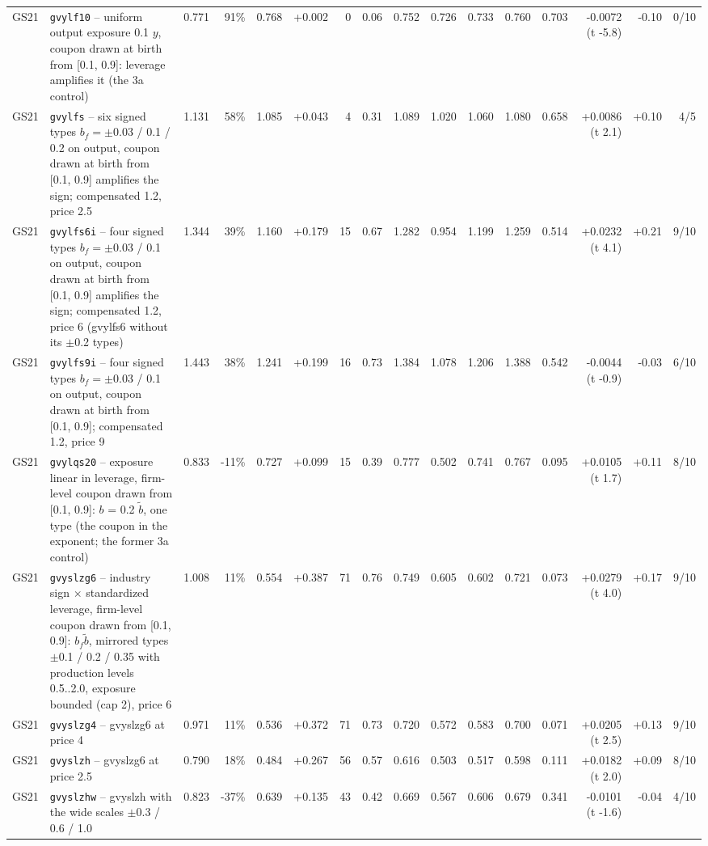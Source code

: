 \begin{landscape}
\begin{longtable}{lp{4.6cm}rrrrrrrrrrrrrr}
GS21 & \texttt{gvylf10} -- uniform output exposure 0.1 $y$, coupon drawn at birth from [0.1, 0.9]: leverage amplifies it (the 3a control) & 0.771 & 91\% & 0.768 & +0.002 & 0 & 0.06 & 0.752 & 0.726 & 0.733 & 0.760 & 0.703 & -0.0072 (t -5.8) & -0.10 & 0/10 \\
GS21 & \texttt{gvylfs} -- six signed types $b_f = \pm$0.03 / 0.1 / 0.2 on output, coupon drawn at birth from [0.1, 0.9] amplifies the sign; compensated 1.2, price 2.5 & 1.131 & 58\% & 1.085 & +0.043 & 4 & 0.31 & 1.089 & 1.020 & 1.060 & 1.080 & 0.658 & +0.0086 (t 2.1) & +0.10 & 4/5 \\
GS21 & \texttt{gvylfs6i} -- four signed types $b_f = \pm$0.03 / 0.1 on output, coupon drawn at birth from [0.1, 0.9] amplifies the sign; compensated 1.2, price 6 (gvylfs6 without its $\pm$0.2 types) & 1.344 & 39\% & 1.160 & +0.179 & 15 & 0.67 & 1.282 & 0.954 & 1.199 & 1.259 & 0.514 & +0.0232 (t 4.1) & +0.21 & 9/10 \\
GS21 & \texttt{gvylfs9i} -- four signed types $b_f = \pm$0.03 / 0.1 on output, coupon drawn at birth from [0.1, 0.9]; compensated 1.2, price 9 & 1.443 & 38\% & 1.241 & +0.199 & 16 & 0.73 & 1.384 & 1.078 & 1.206 & 1.388 & 0.542 & -0.0044 (t -0.9) & -0.03 & 6/10 \\
GS21 & \texttt{gvylqs20} -- exposure linear in leverage, firm-level coupon drawn from [0.1, 0.9]: $b$ = 0.2 $\tilde b$, one type (the coupon in the exponent; the former 3a control) & 0.833 & -11\% & 0.727 & +0.099 & 15 & 0.39 & 0.777 & 0.502 & 0.741 & 0.767 & 0.095 & +0.0105 (t 1.7) & +0.11 & 8/10 \\
GS21 & \texttt{gvyslzg6} -- industry sign $\times$ standardized leverage, firm-level coupon drawn from [0.1, 0.9]: $b_f \tilde b$, mirrored types $\pm$0.1 / 0.2 / 0.35 with production levels 0.5..2.0, exposure bounded (cap 2), price 6 & 1.008 & 11\% & 0.554 & +0.387 & 71 & 0.76 & 0.749 & 0.605 & 0.602 & 0.721 & 0.073 & +0.0279 (t 4.0) & +0.17 & 9/10 \\
GS21 & \texttt{gvyslzg4} -- gvyslzg6 at price 4 & 0.971 & 11\% & 0.536 & +0.372 & 71 & 0.73 & 0.720 & 0.572 & 0.583 & 0.700 & 0.071 & +0.0205 (t 2.5) & +0.13 & 9/10 \\
GS21 & \texttt{gvyslzh} -- gvyslzg6 at price 2.5 & 0.790 & 18\% & 0.484 & +0.267 & 56 & 0.57 & 0.616 & 0.503 & 0.517 & 0.598 & 0.111 & +0.0182 (t 2.0) & +0.09 & 8/10 \\
GS21 & \texttt{gvyslzhw} -- gvyslzh with the wide scales $\pm$0.3 / 0.6 / 1.0 & 0.823 & -37\% & 0.639 & +0.135 & 43 & 0.42 & 0.669 & 0.567 & 0.606 & 0.679 & 0.341 & -0.0101 (t -1.6) & -0.04 & 4/10 \\

\end{longtable}
\end{landscape}
